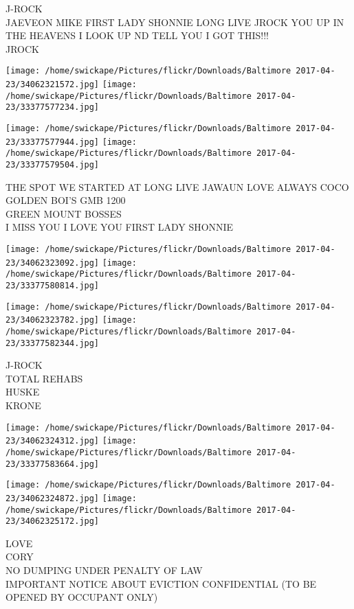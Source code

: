 \documentclass[10pt,letterpaper]{article}
\begin{document}
J{-}ROCK\\
JAEVEON MIKE FIRST LADY SHONNIE LONG LIVE JROCK YOU UP IN THE HEAVENS I LOOK UP ND TELL YOU I GOT THIS!!!\\
JROCK\\
\pagebreak

\texttt{[image: /home/swickape/Pictures/flickr/Downloads/Baltimore 2017-04-23/34062321572.jpg]}
\texttt{[image: /home/swickape/Pictures/flickr/Downloads/Baltimore 2017-04-23/33377577234.jpg]}

\texttt{[image: /home/swickape/Pictures/flickr/Downloads/Baltimore 2017-04-23/33377577944.jpg]}
\texttt{[image: /home/swickape/Pictures/flickr/Downloads/Baltimore 2017-04-23/33377579504.jpg]}

THE SPOT WE STARTED AT LONG LIVE JAWAUN LOVE ALWAYS COCO\\
GOLDEN BOI'S GMB 1200\\
GREEN MOUNT BOSSES\\
I MISS YOU I LOVE YOU FIRST LADY SHONNIE\\
\pagebreak

\texttt{[image: /home/swickape/Pictures/flickr/Downloads/Baltimore 2017-04-23/34062323092.jpg]}
\texttt{[image: /home/swickape/Pictures/flickr/Downloads/Baltimore 2017-04-23/33377580814.jpg]}

\texttt{[image: /home/swickape/Pictures/flickr/Downloads/Baltimore 2017-04-23/34062323782.jpg]}
\texttt{[image: /home/swickape/Pictures/flickr/Downloads/Baltimore 2017-04-23/33377582344.jpg]}

J{-}ROCK\\
TOTAL REHABS\\
HUSKE\\
KRONE\\
\pagebreak

\texttt{[image: /home/swickape/Pictures/flickr/Downloads/Baltimore 2017-04-23/34062324312.jpg]}
\texttt{[image: /home/swickape/Pictures/flickr/Downloads/Baltimore 2017-04-23/33377583664.jpg]}

\texttt{[image: /home/swickape/Pictures/flickr/Downloads/Baltimore 2017-04-23/34062324872.jpg]}
\texttt{[image: /home/swickape/Pictures/flickr/Downloads/Baltimore 2017-04-23/34062325172.jpg]}

LOVE\\
CORY\\
NO DUMPING UNDER PENALTY OF LAW\\
IMPORTANT NOTICE ABOUT EVICTION CONFIDENTIAL (TO BE OPENED BY OCCUPANT ONLY)\\
\pagebreak
\end{document}
